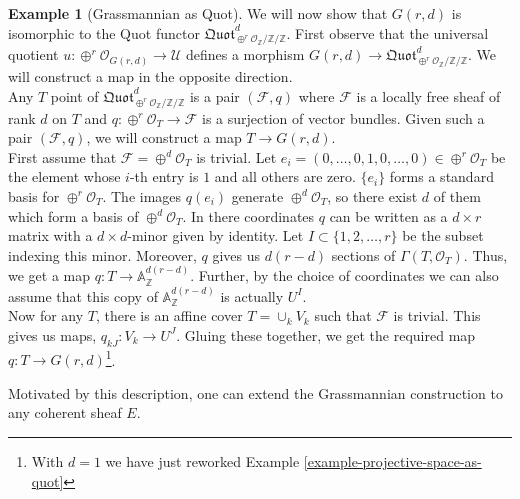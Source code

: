 \documentclass[11pt]{amsart}
\newcommand{\sF}{{\mathcal F}}
\newcommand{\sO}{{\mathcal O}}
\newcommand{\sU}{{\mathcal U}}
\newcommand{\A}{{\mathbb A}}
\newcommand{\Z}{{\mathbb Z}}
\theoremstyle{definition}
\newtheorem{example}[theorem]{Example}
\begin{document}
\begin{example}[Grassmannian as Quot]
\label{example-grassmannian-as-quot}
We will now show that $G(r,d)$ is isomorphic to the Quot functor $\mathfrak{Quot}^d_{\oplus^r\sO_\Z/\Z/\Z}$. First observe that the universal quotient $u: \oplus^r \sO_{G(r,d)}\rightarrow \sU$ defines a morphism $G(r,d)\rightarrow \mathfrak{Quot}^d_{\oplus^r\sO_\Z/\Z/\Z}$. We will construct a map in the opposite direction.\\
Any $T$ point of $\mathfrak{Quot}^d_{\oplus^r\sO_\Z/\Z/\Z}$ is a pair $(\sF,q)$ where $\sF$ is a locally free sheaf of rank $d$ on $T$ and $q: \oplus^r \sO_T\rightarrow \sF$ is a surjection of vector bundles. Given such a pair $(\sF,q)$, we will construct a map $T\rightarrow G(r,d)$.\\
First assume that $\sF=\oplus^d \sO_T$ is trivial. Let $e_i=(0,\ldots,0,1,0,\ldots,0)\in \oplus^r \sO_T$ be the element whose $i$-th entry is $1$ and all others are zero. $\{e_i\}$ forms a standard basis for $\oplus^r \sO_T$. The images $q(e_i)$ generate $\oplus^d \sO_T$, so there exist $d$ of them which form a basis of $\oplus^d \sO_T$. In there coordinates $q$ can be written as a $d\times r$ matrix with a $d\times d$-minor given by identity. Let $I\subset \{1,2,\ldots,r\}$ be the subset indexing this minor. Moreover, $q$ gives us $d(r-d)$ sections of $\Gamma(T,\sO_T)$. Thus, we get a map $q: T\rightarrow \A^{d(r-d)}_\Z$. Further, by the choice of coordinates we can also assume that this copy of $\A^{d(r-d)}_\Z$ is actually $U^I$.\\
Now for any $T$, there is an affine cover $T=\cup_k V_k$ such that $\sF$ is trivial. This gives us maps, $q_{kJ}: V_k\rightarrow U^J$. Gluing these together, we get the required map $q: T\rightarrow G(r,d)$\footnote{With $d=1$ we have just reworked Example \ref{example-projective-space-as-quot}}.
\end{example}

Motivated by this description, one can extend the Grassmannian construction to any coherent sheaf $E$.
\end{document}
